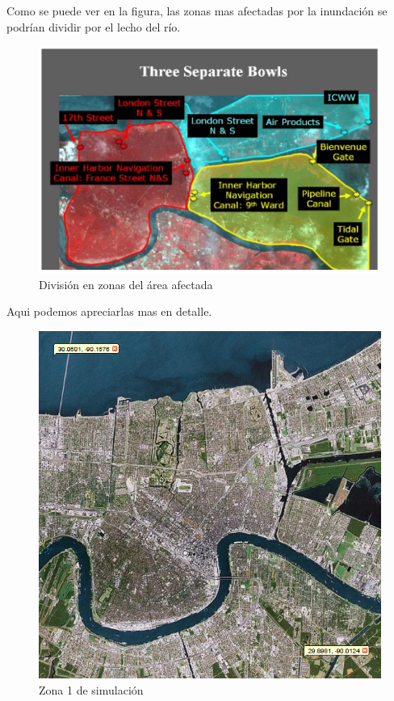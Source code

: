 Como se puede ver en la figura, las zonas mas afectadas por la inundación se
podrían dividir por el lecho del río.

\begin{figure}[H]
 \centering
 \includegraphics[width=120mm]{figuras/cap6/affected.png}
 \caption{División en zonas del área afectada}
\end{figure}

Aqui podemos apreciarlas mas en detalle.

\begin{figure}[H]
 \centering
 \includegraphics[width=120mm]{figuras/cap6/NOarea2.png}
 \caption{Zona 1 de simulación}
\end{figure}

